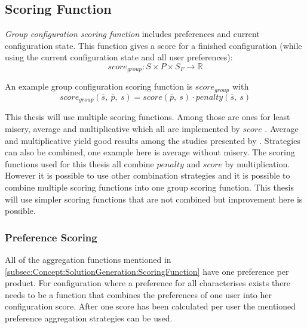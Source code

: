 \subsection{Scoring Function}
\label{subsec:Concept:SolutionGeneration:ScoringFunction}

\emph{Group configuration scoring function} includes preferences and current configuration state. This function gives a score for a finished configuration (while using the current configuration state and all user preferences):
\begin{equation}
    score_{group}: S \times P \times S_F \to \mathbb{R}
\end{equation}

An example group configuration scoring function is $score_{group}$ with 
\begin{equation}
    score_{group}(\overline{s},\ \overline{p},\ s) = score(\overline{p},\ s) \cdot penalty(\overline{s},\ s)
\end{equation} 

This thesis will use multiple scoring functions. Among those are ones for least misery, average and multiplicative which all are implemented by $score$ . Average and multiplicative yield good results among the studies presented by \citeauthor{Masthoff2015} \cite{Masthoff2015}. Strategies can also be combined, one example here is average without misery. The scoring functions used for this thesis all combine $penalty$ and $score$ by multiplication. However it is possible to use other combination strategies and it is possible to combine multiple scoring functions into one group scoring function. This thesis will use simpler scoring functions that are not combined but improvement here is possible.

\subsubsection{Preference Scoring}

All of the aggregation functions mentioned in \autoref{subsec:Concept:SolutionGeneration:ScoringFunction} have one preference per product. For configuration where a preference for all characterises exists there needs to be a function that combines the preferences of one user into her configuration score. After one score has been calculated per user the mentioned preference aggregation strategies can be used.

